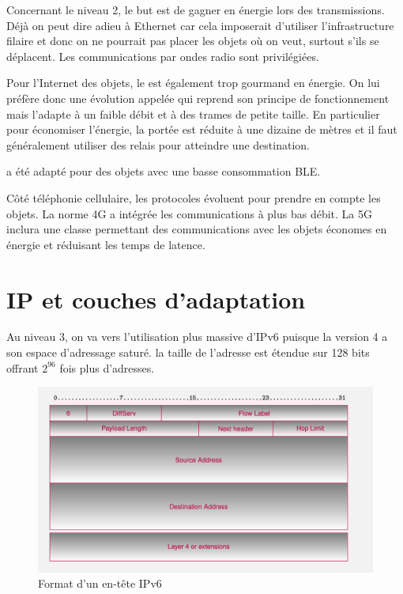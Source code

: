  Concernant le niveau 2, le but est de gagner en énergie lors des transmissions. Déjà on peut dire adieu à Ethernet car cela imposerait d'utiliser l'infrastructure filaire et donc on ne pourrait pas placer les objets où on veut, surtout s'ils se déplacent. Les communications par ondes radio sont privilégiées. 
 
 Pour l'Internet des objets, le  est également trop gourmand en énergie. On lui préfère donc une évolution appelée  qui reprend son principe de fonctionnement mais l'adapte à un faible débit et à des trames de petite taille. En particulier pour économiser l'énergie, la portée est réduite à une dizaine de mètres et il faut généralement utiliser des relais pour atteindre une destination. 
 
  a été adapté pour des objets avec une basse consommation \ac{BLE}. 
     \vspace{1em}

 Côté téléphonie cellulaire, les protocoles évoluent pour prendre en compte les objets. La norme 4G a intégrée les communications à plus bas débit. La 5G inclura une classe permettant des communications avec les objets économes en énergie et réduisant les temps de latence. 
 
\section{IP et couches d'adaptation}

  Au niveau 3, on va vers l'utilisation plus massive d'\ac{IPv6} puisque la version 4 a son espace d'adressage saturé. la taille de l’adresse est étendue sur 128 bits offrant $2^{96}$ fois plus d’adresses.
  
  \begin{figure}[tbp]
\centerline{\includegraphics[width=1\columnwidth]{Pictures/Capture18.png}}
\caption{Format d'un en-tête IPv6}
\label{fig-IPv6-header}
\end{figure}


